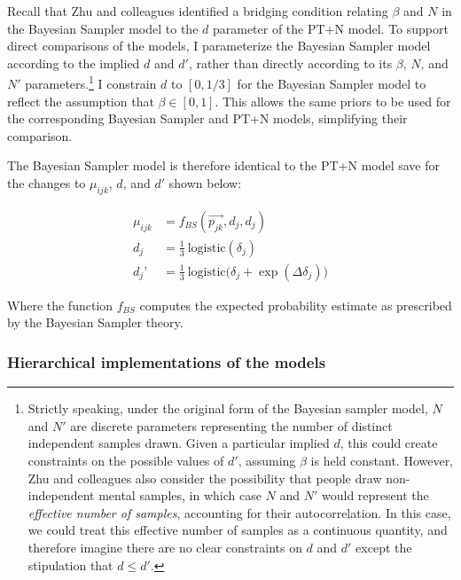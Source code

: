 \documentclass[
  english,
  man,floatsintext]{apa6}
\begin{document}
Recall that Zhu and colleagues \autocite*{zhu.etal2020} identified a bridging condition relating \(\beta\) and \(N\) in the Bayesian Sampler model to the \(d\) parameter of the PT+N model. To support direct comparisons of the models, I parameterize the Bayesian Sampler model according to the implied \(d\) and \(d'\), rather than directly according to its \(\beta\), \(N\), and \(N'\) parameters.\footnote{Strictly speaking, under the original form of the Bayesian sampler model, \(N\) and \(N'\) are discrete parameters representing the number of distinct independent samples drawn. Given a particular implied \(d\), this could create constraints on the possible values of \(d'\), assuming \(\beta\) is held constant. However, Zhu and colleagues \autocite*{zhu.etal2020} also consider the possibility that people draw non-independent mental samples, in which case \(N\) and \(N'\) would represent the \emph{effective number of samples}, accounting for their autocorrelation. In this case, we could treat this effective number of samples as a continuous quantity, and therefore imagine there are no clear constraints on \(d\) and \(d'\) except the stipulation that \(d \leq d'\).} I constrain \(d\) to \([0, 1/3]\) for the Bayesian Sampler model to reflect the assumption that \(\beta \in [0, 1]\). This allows the same priors to be used for the corresponding Bayesian Sampler and PT+N models, simplifying their comparison.

The Bayesian Sampler model is therefore identical to the PT+N model save for the changes to \(\mu_{ijk}\), \(d\), and \(d'\) shown below:

\begin{align*}
  \mu_{ijk} &= f_{BS}(\overrightarrow{p_{jk}}, d_j, d_j)  \\
  d_j &= \frac{1}{3} \ \text{logistic}(\delta_j) \\
  d_j’ &= \frac{1}{3} \ \text{logistic}\big(\delta_j + \exp(\Delta\delta_j)\big)
\end{align*}

Where the function \(f_{BS}\) computes the expected probability estimate as prescribed by the Bayesian Sampler theory.

\hypertarget{hierarchical-implementations-of-the-models}{%
\subsubsection{Hierarchical implementations of the models}\label{hierarchical-implementations-of-the-models}}
\end{document}
